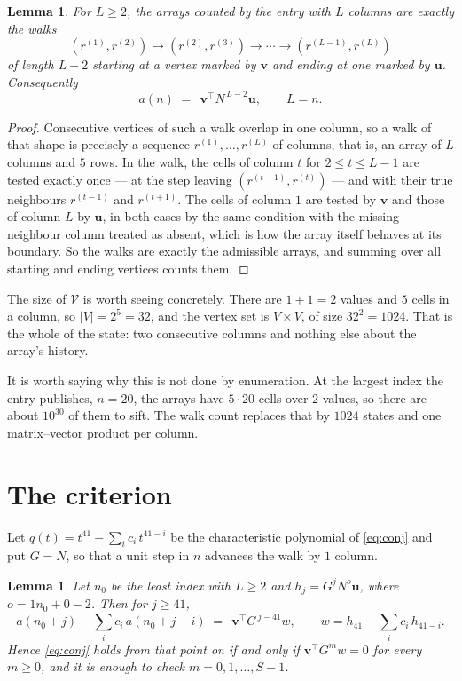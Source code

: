 \documentclass[11pt,a4paper]{article}
\theoremstyle{plain}
\newtheorem{lemma}[theorem]{Lemma}
\theoremstyle{definition}
\begin{document}
\begin{lemma}\label{lem:walk}
For $L\ge2$, the arrays counted by the entry with $L$ columns are exactly the walks
\[
(r^{(1)},r^{(2)})\to(r^{(2)},r^{(3)})\to\cdots\to(r^{(L-1)},r^{(L)})
\]
of length $L-2$ starting at a vertex marked by $\mathbf{v}$ and ending at one marked by
$\mathbf{u}$. Consequently
\[
a(n)\;=\;\,\mathbf{v}^{\!\top}N^{\,L-2}\mathbf{u},\qquad L=n .
\]
\end{lemma}

\begin{proof}
Consecutive vertices of such a walk overlap in one column, so a walk of that shape is
precisely a sequence $r^{(1)},\dots,r^{(L)}$ of columns, that is, an array of $L$ columns
and $5$ rows. In the walk, the cells of column $t$ for $2\le t\le L-1$ are tested
exactly once --- at the step leaving $(r^{(t-1)},r^{(t)})$ --- and with their true
neighbours $r^{(t-1)}$ and $r^{(t+1)}$. The cells of column $1$ are tested by
$\mathbf{v}$ and those of column $L$ by $\mathbf{u}$, in both cases by the same condition
with the missing neighbour column treated as absent, which is how the array itself behaves at
its boundary. So the walks are exactly the admissible arrays, and summing over all starting
and ending vertices counts them.
\end{proof}


The size of $\mathcal V$ is worth seeing concretely. There are $1+1=2$ values
and $5$ cells in a column, so $|V|=2^{5}=32$, and the vertex set is
$V\times V$, of size $32^2=1024$. That is the whole of the state: two consecutive
columns and nothing else about the array's history.

It is worth saying why this is not done by enumeration. At the largest index the entry
publishes, $n=20$, the arrays have $5\cdot20$ cells over
$2$ values, so there are about $10^{30}$ of them to sift. The
walk count replaces that by $1024$ states and one matrix--vector product per column.
\section{The criterion}

Let $q(t)=t^{41}-\sum_i c_i\,t^{41-i}$ be the characteristic polynomial of
\eqref{eq:conj} and put $G=N$, so that a unit step in $n$ advances the walk by
$1$ column.

\begin{lemma}\label{lem:crit}
Let $n_0$ be the least index with $L\ge2$ and $h_j=G^{j}N^{o}\mathbf{u}$, where
$o=1n_0+0-2$. Then for $j\ge41$,
\[
a(n_0+j)-\sum_i c_i\,a(n_0+j-i)\;=\;\,\mathbf{v}^{\!\top}G^{\,j-41}w,
\qquad w=h_{41}-\sum_i c_i\,h_{41-i} .
\]
Hence \eqref{eq:conj} holds from that point on if and only if
$\mathbf{v}^{\!\top}G^{m}w=0$ for every $m\ge0$, and it is enough to check
$m=0,1,\dots,S-1$.
\end{lemma}
\end{document}
